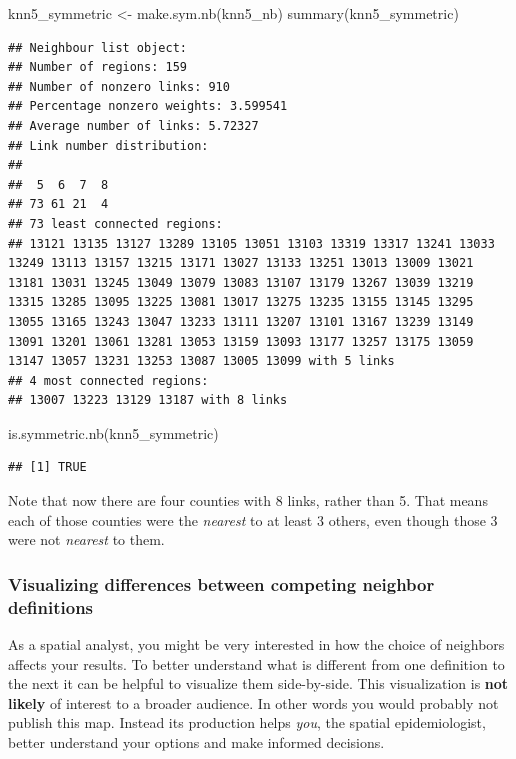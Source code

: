 \documentclass[
]{book}
\newenvironment{Shaded}{\begin{snugshade}}{\end{snugshade}}
\newcommand{\FunctionTok}[1]{\textcolor[rgb]{0.00,0.00,0.00}{#1}}
\newcommand{\NormalTok}[1]{#1}
\newcommand{\OtherTok}[1]{\textcolor[rgb]{0.56,0.35,0.01}{#1}}
\newenvironment{rmdtip}[1]
  {
  \begin{itemize}
  \renewcommand{\labelitemi}{
    \raisebox{-.7\height}[0pt][0pt]{
      {\setkeys{Gin}{width=3em,keepaspectratio}\texttt{[image: images/\#1]}}
    }
  }
  \setlength{\fboxsep}{1em}
  \begin{tip}
  \item
  }
  {
  \end{tip}
  \end{itemize}
  }
\begin{document}
\begin{Shaded}
\begin{Highlighting}[]
\NormalTok{knn5\_symmetric }\OtherTok{\textless{}{-}} \FunctionTok{make.sym.nb}\NormalTok{(knn5\_nb)}
\FunctionTok{summary}\NormalTok{(knn5\_symmetric)}
\end{Highlighting}
\end{Shaded}

\begin{verbatim}
## Neighbour list object:
## Number of regions: 159 
## Number of nonzero links: 910 
## Percentage nonzero weights: 3.599541 
## Average number of links: 5.72327 
## Link number distribution:
## 
##  5  6  7  8 
## 73 61 21  4 
## 73 least connected regions:
## 13121 13135 13127 13289 13105 13051 13103 13319 13317 13241 13033 13249 13113 13157 13215 13171 13027 13133 13251 13013 13009 13021 13181 13031 13245 13049 13079 13083 13107 13179 13267 13039 13219 13315 13285 13095 13225 13081 13017 13275 13235 13155 13145 13295 13055 13165 13243 13047 13233 13111 13207 13101 13167 13239 13149 13091 13201 13061 13281 13053 13159 13093 13177 13257 13175 13059 13147 13057 13231 13253 13087 13005 13099 with 5 links
## 4 most connected regions:
## 13007 13223 13129 13187 with 8 links
\end{verbatim}

\begin{Shaded}
\begin{Highlighting}[]
\FunctionTok{is.symmetric.nb}\NormalTok{(knn5\_symmetric)}
\end{Highlighting}
\end{Shaded}

\begin{verbatim}
## [1] TRUE
\end{verbatim}

Note that now there are four counties with 8 links, rather than 5. That means each of those counties were the \emph{nearest} to at least 3 others, even though those 3 were not \emph{nearest} to them.

\hypertarget{visualizing-differences-between-competing-neighbor-definitions}{%
\subsubsection{Visualizing differences between competing neighbor definitions}\label{visualizing-differences-between-competing-neighbor-definitions}}

\begin{rmdtip}{tip}
As a spatial analyst, you might be very interested in how the choice of neighbors affects your results. To better understand what is different from one definition to the next it can be helpful to visualize them side-by-side. This visualization is \textbf{not likely} of interest to a broader audience. In other words you would probably not publish this map. Instead its production helps \emph{you}, the spatial epidemiologist, better understand your options and make informed decisions.

\end{rmdtip}
\end{document}
